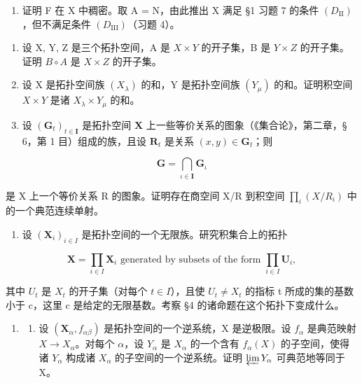\begin{enumerate}
\def\labelenumi{\alph{enumi})}
\setcounter{enumi}{1}
\tightlist
\item
  证明 F 在 X 中稠密。取 A = N，由此推出 X 满足 §1 习题 7 的条件 \((D_{\mathrm{II}})\)，但不满足条件 \((D_{\mathrm{III}})\)（习题 4）。
\end{enumerate}

\begin{enumerate}
\def\labelenumi{\arabic{enumi})}
\setcounter{enumi}{5}
\item
  设 X, Y, Z 是三个拓扑空间，A 是 \(X \times Y\) 的开子集，B 是 \(Y \times Z\) 的开子集。证明 \(B \circ A\) 是 \(X \times Z\) 的开子集。
\item
  设 X 是拓扑空间族 \((X_{\lambda})\) 的和，Y 是拓扑空间族 \((Y_{\mu})\) 的和。证明积空间 \(X \times Y\) 是诸 \(X_{\lambda} \times Y_{\mu}\) 的和。
\item
  设 \((\mathbf{G}_t)_{t \in \mathbf{I}}\) 是拓扑空间 \(\mathbf{X}\) 上一些等价关系的图象（《集合论》，第二章，§ 6，第 1 目）组成的族，且设 \(\mathbf{R}_t\) 是关系 \((x, y) \in \mathbf{G}_t\)；则
\end{enumerate}

\[
\mathbf {G} = \bigcap_ {\iota \in \mathbf {I}} \mathbf {G} _ {\iota}
\]

是 X 上一个等价关系 R 的图象。证明存在商空间 X/R 到积空间 \(\prod_{i}\left(X/R_{i}\right)\) 中的一个典范连续单射。

\begin{enumerate}
\def\labelenumi{\arabic{enumi})}
\setcounter{enumi}{8}
\tightlist
\item
  设 \((\mathbf{X}_i)_{i\in I}\) 是拓扑空间的一个无限族。研究积集合上的拓扑
\end{enumerate}

\[
\mathbf {X} = \prod_ {i \in I} \mathbf {X} _ {i} \text {   generated   by   subsets   of   the   form   } \prod_ {i \in I} \mathbf {U} _ {i},
\]

其中 \(U_{t}\) 是 \(X_{t}\) 的开子集（对每个 \(t \in I\)），且使 \(U_{t} \neq X_{t}\) 的指标 t 所成的集的基数小于 c，这里 c 是给定的无限基数。考察 §4 的诸命题在这个拓扑下变成什么。

\begin{enumerate}
\def\labelenumi{\arabic{enumi})}
\setcounter{enumi}{9}
\tightlist
\item
  \begin{enumerate}
  \def\labelenumii{\alph{enumii})}
  \tightlist
  \item
    设 \((\mathbf{X}_{\alpha}, f_{\alpha\beta})\) 是拓扑空间的一个逆系统，X 是逆极限。设 \(f_{\alpha}\) 是典范映射 \(X \to X_{\alpha}\)。对每个 \(\alpha\)，设 \(Y_{\alpha}\) 是 \(X_{\alpha}\) 的一个含有 \(f_{\alpha}(X)\) 的子空间，使得诸 \(Y_{\alpha}\) 构成诸 \(X_{\alpha}\) 的子空间的一个逆系统。证明 \(\varprojlim Y_{\alpha}\) 可典范地等同于 X。
  \end{enumerate}
\end{enumerate}

